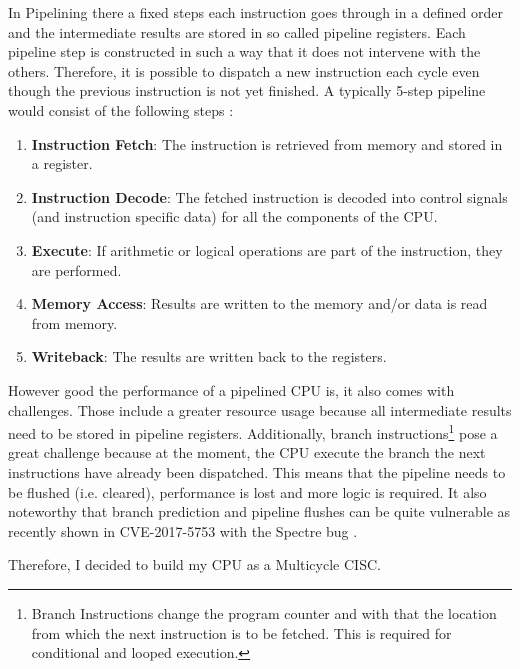 In Pipelining there a fixed steps each instruction goes through in a defined order and the intermediate results are stored in so called pipeline registers.
Each pipeline step is constructed in such a way that it does not intervene with the others.
Therefore, it is possible to dispatch a new instruction each cycle even though the previous instruction is not yet finished.
A typically 5-step pipeline would consist of the following steps \cite{PattersonDavid2016RuRD}:
\begin{enumerate}
  \item \textbf{Instruction Fetch}: The instruction is retrieved from memory and stored in a register.
  \item \textbf{Instruction Decode}: The fetched instruction is decoded into control signals (and instruction specific data) for all the components of the \gls{CPU}.
  \item \textbf{Execute}: If arithmetic or logical operations are part of the instruction, they are performed.
  \item \textbf{Memory Access}: Results are written to the memory and/or data is read from memory.
  \item \textbf{Writeback}: The results are written back to the registers.
\end{enumerate}
However good the performance of a pipelined \gls{CPU} is, it also comes with challenges.
Those include a greater resource usage because all intermediate results need to be stored in pipeline registers.
Additionally, branch instructions\footnote{Branch Instructions change the program counter and with that the location from which the next instruction is to be fetched. This is required for conditional and looped execution.} pose a great challenge because at the moment, the \gls{CPU} execute the branch the next instructions have already been dispatched.
This means that the pipeline needs to be flushed (i.e. cleared), performance is lost and more logic is required.
It also noteworthy that branch prediction and pipeline flushes can be quite vulnerable as recently shown in CVE-2017-5753 with the Spectre bug \cite{CVE-2017-5753}.

Therefore, I decided to build my \gls{CPU} as a Multicycle \gls{CISC}.

